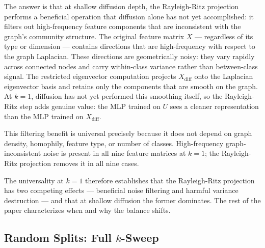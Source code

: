 \documentclass[11pt]{article}
\begin{document}
The answer is that at shallow diffusion depth, the Rayleigh-Ritz projection performs
a beneficial operation that diffusion alone has not yet accomplished: it filters out
high-frequency feature components that are inconsistent with the graph's community
structure.  The original feature matrix $X$ — regardless of its type or dimension —
contains directions that are high-frequency with respect to the graph Laplacian.
These directions are geometrically noisy: they vary rapidly across connected nodes and
carry within-class variance rather than between-class signal.  The restricted
eigenvector computation projects $X_{\mathrm{diff}}$ onto the Laplacian eigenvector
basis and retains only the components that are smooth on the graph.  At $k{=}1$,
diffusion has not yet performed this smoothing itself, so the Rayleigh-Ritz step adds
genuine value: the MLP trained on $U$ sees a cleaner representation than the MLP
trained on $X_{\mathrm{diff}}$.

This filtering benefit is universal precisely because it does not depend on graph
density, homophily, feature type, or number of classes.  High-frequency graph-inconsistent
noise is present in all nine feature matrices at $k{=}1$; the Rayleigh-Ritz projection
removes it in all nine cases.

The universality at $k{=}1$ therefore establishes that the Rayleigh-Ritz projection
has two competing effects — beneficial noise filtering and harmful variance destruction
— and that at shallow diffusion the former dominates.  The rest of the paper
characterizes when and why the balance shifts.

\subsection{Random Splits: Full $k$-Sweep}
\end{document}
